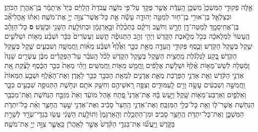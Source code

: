 \documentclass[twoside, openany, parskip=half, 11pt]{book}
\begin{document}
\begin{footnotesize}
\begin{multicols}{2}
\\
 אֵ֣לֶּה פְקוּדֵ֤י הַמִּשְׁכָּן֙ מִשְׁכַּ֣ן הָֽעֵדֻ֔ת אֲשֶׁ֥ר פֻּקַּ֖ד עַל־פִּ֣י מֹשֶׁ֑ה עֲבֹדַת֙ הַֽלְוִיִּ֔ם בְּיַד֙ אִֽיתָמָ֔ר בֶּֽן־אַֽהֲרֹ֖ן הַכֹּהֵֽן׃ וּבְצַלְאֵ֛ל בֶּן־אוּרִ֥י בֶן־ח֖וּר לְמַטֵּ֣ה יְהוּדָ֑ה עָשָׂ֕ה אֵ֛ת כָּל־אֲשֶׁר־צִוָּ֥ה יְיָ֖ אֶת־מֹשֶֽׁה׃ וְאִתּ֗וֹ אָֽהֳלִיאָ֞ב בֶּן־אֲחִֽיסָמָ֛ךְ לְמַטֵּה־דָ֖ן חָרָ֣שׁ וְחֹשֵׁ֑ב וְרֹקֵ֗ם בַּתְּכֵ֨לֶת֙ וּבָ֣אַרְגָּמָ֔ן וּבְתוֹלַ֥עַת הַשָּׁנִ֖י וּבַשֵּֽׁשׁ׃ \textbf{ס}  כָּל־הַזָּהָ֗ב הֶֽעָשׂוּי֙ לַמְּלָאכָ֔ה בְּכֹ֖ל מְלֶ֣אכֶת הַקֹּ֑דֶשׁ וַיְהִ֣י זְהַ֣ב הַתְּנוּפָ֗ה תֵּ֤שַׁע וְעֶשְׂרִים֙ כִּכָּ֔ר וּשְׁבַ֨ע מֵא֧וֹת וּשְׁלֹשִׁ֛ים שֶׁ֖קֶל בְּשֶׁ֥קֶל הַקֹּֽדֶשׁ׃ וְכֶ֛סֶף פְּקוּדֵ֥י הָֽעֵדָ֖ה מְאַ֣ת כִּכָּ֑ר וְאֶ֩לֶף֩ וּשְׁבַ֨ע מֵא֜וֹת וַֽחֲמִשָּׁ֧ה וְשִׁבְעִ֛ים שֶׁ֖קֶל בְּשֶׁ֥קֶל הַקֹּֽדֶשׁ׃ בֶּ֚קַע לַגֻּלְגֹּ֔לֶת מַֽחֲצִ֥ית הַשֶּׁ֖קֶל בְּשֶׁ֣קֶל הַקֹּ֑דֶשׁ לְכֹ֨ל הָֽעֹבֵ֜ר עַל־הַפְּקֻדִ֗ים מִבֶּ֨ן עֶשְׂרִ֤ים שָׁנָה֙ וָמַ֔עְלָה לְשֵׁשׁ־מֵא֥וֹת אֶ֨לֶף֙ וּשְׁלֹ֣שֶׁת אֲלָפִ֔ים וַֽחֲמֵ֥שׁ מֵא֖וֹת וַֽחֲמִשִּֽׁים׃ וַיְהִ֗י מְאַת֙ כִּכַּ֣ר הַכֶּ֔סֶף לָצֶ֗קֶת אֵ֚ת אַדְנֵ֣י הַקֹּ֔דֶשׁ וְאֵ֖ת אַדְנֵ֣י הַפָּרֹ֑כֶת מְאַ֧ת אֲדָנִ֛ים לִמְאַ֥ת הַכִּכָּ֖ר כִּכָּ֥ר לָאָֽדֶן׃  וְאֶת־הָאֶ֜לֶף וּשְׁבַ֤ע הַמֵּאוֹת֙ וַֽחֲמִשָּׁ֣ה וְשִׁבְעִ֔ים עָשָׂ֥ה וָוִ֖ים לָֽעַמּוּדִ֑ים וְצִפָּ֥ה רָֽאשֵׁיהֶ֖ם וְחִשַּׁ֥ק אֹתָֽם׃ וּנְחֹ֥שֶׁת הַתְּנוּפָ֖ה שִׁבְעִ֣ים כִּכָּ֑ר וְאַלְפַּ֥יִם וְאַרְבַּע־מֵא֖וֹת שָֽׁקֶל׃ וַיַּ֣עַשׂ בָּ֗הּ אֶת־אַדְנֵי֙ פֶּ֚תַח אֹ֣הֶל מוֹעֵ֔ד וְאֵת֙ מִזְבַּ֣ח הַנְּחֹ֔שֶׁת וְאֶת־מִכְבַּ֥ר הַנְּחֹ֖שֶׁת אֲשֶׁר־ל֑וֹ וְאֵ֖ת כָּל־כְּלֵ֥י הַמִּזְבֵּֽחַ׃ וְאֶת־אַדְנֵ֤י הֶֽחָצֵר֙ סָבִ֔יב וְאֶת־אַדְנֵ֖י שַׁ֣עַר הֶֽחָצֵ֑ר וְאֵ֨ת כָּל־יִתְדֹ֧ת הַמִּשְׁכָּ֛ן וְאֶת־כָּל־יִתְדֹ֥ת הֶֽחָצֵ֖ר סָבִֽיב׃ וּמִן־הַתְּכֵ֤לֶת וְהָֽאַרְגָּמָן֙ וְתוֹלַ֣עַת הַשָּׁנִ֔י עָשׂ֥וּ בִגְדֵֽי־שְׂרָ֖ד לְשָׁרֵ֣ת בַּקֹּ֑דֶשׁ וַֽיַּֽעֲשׂ֞וּ אֶת־בִּגְדֵ֤י הַקֹּ֨דֶשׁ֙ אֲשֶׁ֣ר לְאַֽהֲרֹ֔ן כַּֽאֲשֶׁ֛ר צִוָּ֥ה יְיָ֖ אֶת־מֹשֶֽׁה׃


\end{multicols}
\end{footnotesize}
\end{document}
